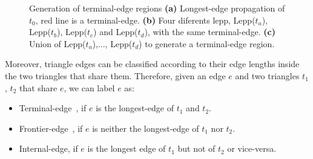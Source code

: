 \begin{figure}[h]
\centering     %
{} 
\caption{Generation of terminal-edge regions \textbf{(a)} Longest-edge propagation of $t_0$, red line is a terminal-edge. \textbf{(b)} Four diferents lepp, Lepp($t_a$), Lepp($t_b$), Lepp($t_c$) and Lepp($t_d$), with the same terminal-edge. \textbf{(c)} Union of Lepp($t_a$),..., Lepp($t_d$) to generate a terminal-edge region.}
\label{fig:leppexample} 
\end{figure}

\noindent
Moreover, triangle edges can be classified according to their edge lengths inside the two triangles that share them. Therefore, given an edge $e$ and two triangles $t_1$, $t_2$ that share $e$, we can label  $e$ as: 

\begin{itemize}
    \item Terminal-edge~\cite{Rivara97}, if $e$ is the longest-edge of $t_1$ and $t_2$.
    \item Frontier-edge~\cite{Ascom209}, if $e$ is neither the longest-edge of $t_1$ nor $t_2$.
    \item Internal-edge, if $e$ is the longest edge of $t_1$ but not of $t_2$ or vice-versa.
\end{itemize}


